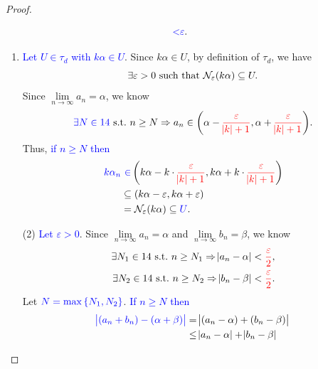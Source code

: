 \documentclass[11pt,openany]{article}
\begin{document}
\begin{note}[]
\begin{proof}
\begin{flushleft}
\begin{minipage}[t]{0.475\textwidth}
\begin{enumerate}[(1)]
\begin{align*}
		&\textcolor{blue}{<}\textcolor{blue}{\varepsilon}.
	\end{align*}
\end{enumerate}
\end{minipage}%
\hfill\vline
\begin{minipage}[t]{0.49\textwidth}
\begin{enumerate}[(1)]
	\item \textcolor{blue}{Let $U\in\tau_d$ with $k\alpha\in U$}. Since $k\alpha\in U$, by definition of $\tau_d$, we have \[
	\exists\varepsilon>0\ \text{such that}\ \mathcal{N}_{\varepsilon}(k\alpha)\subseteq U.
	\] Since $\lim\limits_{n\to\infty}a_n=\alpha$, we know \[
	\textcolor{blue}{\exists N\in\N}\ \text{s.t.}\ n\geq N\Rightarrow a_n\in {\intoo{\alpha-\textcolor{red}{\frac{\varepsilon}{\abs{k}+1}},\alpha+\textcolor{red}{\frac{\varepsilon}{\abs{k}+1}}}}.
	\] Thus, \textcolor{blue}{if $n\geq N$ then} \begin{align*}
		\textcolor{blue}{k\alpha_n}&\ \textcolor{blue}{\in}\intoo{k\alpha-k\cdot\textcolor{red}{\frac{\varepsilon}{\abs{k}+1}},k\alpha+k\cdot\textcolor{red}{\frac{\varepsilon}{\abs{k}+1}}}\\
		&\subseteq\intoo{k\alpha-\varepsilon,k\alpha+\varepsilon}\\
		&=\nbhd_\varepsilon(k\alpha)\subseteq\textcolor{blue}{U}.
	\end{align*}
\end{enumerate}
\end{minipage}
\end{flushleft}
\newpage
\begin{flushleft}
\begin{minipage}[t]{0.475\textwidth}
\begin{enumerate}
	\item[(2)] \textcolor{blue}{Let $\varepsilon>0$}. Since $\lim\limits_{n\to\infty}a_n=\alpha$ and $\lim\limits_{n\to\infty}b_n=\beta$, we know \begin{align*}
		\exists N_1\in14\ \text{s.t.}\ n\geq N_1\Rightarrow\abs{a_n-\alpha}<\textcolor{red}{\frac{\varepsilon}{2}},\\
		\exists N_2\in14\ \text{s.t.}\ n\geq N_2\Rightarrow\abs{b_n-\beta}<\textcolor{red}{\frac{\varepsilon}{2}}.
	\end{align*} Let $\textcolor{blue}{N=\max\set{N_1,N_2}}$. \textcolor{blue}{If $n\geq N$ then} \begin{align*}
		\textcolor{blue}{\abs{(a_n+ b_n)-(\alpha+ \beta)}}&=\abs{(a_n-\alpha)+(b_n-\beta)}\\
		&\leq\abs{a_n-\alpha}+\abs{b_n-\beta}\\

\end{align*}
\end{enumerate}
\end{minipage}
\end{flushleft}
\end{proof}
\end{note}
\end{document}
